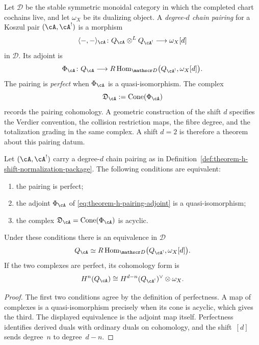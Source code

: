 \begin{definition}
\label{def:theorem-h-shift-normalization-package}
Let \(\mathscr D\) be the stable symmetric monoidal category in which
the completed chart cochains live, and let \(\omega_X\) be its
dualizing object.  A \emph{degree-\(d\) chain pairing} for a Koszul
pair \((\cA,\cA^!)\) is a morphism
\[
 \langle-,-\rangle_\cA\colon
 Q_\cA\otimes^{L}Q_{\cA^!}
 \longrightarrow \omega_X[d]
\]
in \(\mathscr D\).  Its adjoint is
\begin{equation}\label{eq:theorem-h-pairing-adjoint}
 \Phi_\cA\colon Q_\cA
 \longrightarrow
 R\operatorname{Hom}_{\mathscr D}
 \bigl(Q_{\cA^!},\omega_X[d]\bigr).
\end{equation}
The pairing is \emph{perfect} when \(\Phi_\cA\) is a
quasi-isomorphism.  The complex
\[
 \mathfrak D_\cA:=\operatorname{Cone}(\Phi_\cA)
\]
records the pairing cohomology.  A geometric construction of the
shift \(d\) specifies the Verdier convention, the collision
restriction maps, the fibre degree, and the totalization grading in
the same complex.  A shift \(d=2\) is therefore a theorem about this
pairing datum.
\end{definition}

\begin{lemma}
\label{lem:hochschild-shift-computation}
Let \((\cA,\cA^!)\) carry a degree-\(d\) chain pairing as in
Definition~\ref{def:theorem-h-shift-normalization-package}.  The
following conditions are equivalent:
\begin{enumerate}[label=\textup{(\roman*)}]
\item the pairing is perfect;
\item the adjoint \(\Phi_\cA\) of
\eqref{eq:theorem-h-pairing-adjoint} is a quasi-isomorphism;
\item the complex \(\mathfrak D_\cA=\operatorname{Cone}(\Phi_\cA)\)
is acyclic.
\end{enumerate}
Under these conditions there is an equivalence in \(\mathscr D\)
\[
 Q_\cA\simeq
 R\operatorname{Hom}_{\mathscr D}
 \bigl(Q_{\cA^!},\omega_X[d]\bigr).
\]
If the two complexes are perfect, its cohomology form is
\[
 H^n(Q_\cA)
 \cong
 H^{d-n}(Q_{\cA^!})^\vee\otimes\omega_X.
\]
\end{lemma}

\begin{proof}
The first two conditions agree by the definition of perfectness.  A
map of complexes is a quasi-isomorphism precisely when its cone is
acyclic, which gives the third.  The displayed equivalence is the
adjoint map itself.  Perfectness identifies derived duals with
ordinary duals on cohomology, and the shift~\([d]\) sends degree~\(n\)
to degree~\(d-n\).
\end{proof}

